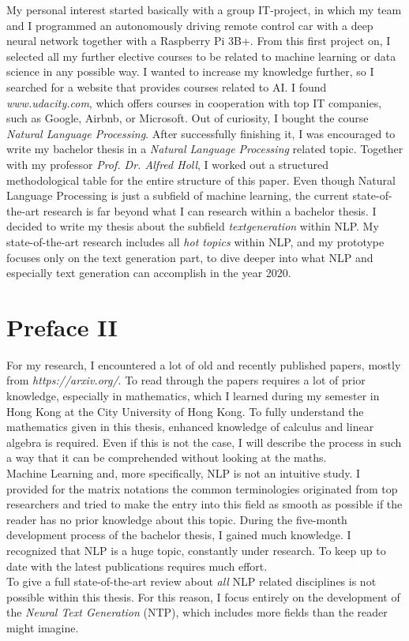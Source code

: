 My personal interest started basically with a group IT-project, in which my team and I programmed an autonomously driving remote control car with a deep neural network together with a Raspberry Pi 3B+. From this first project on, I selected all my further elective courses to be related to machine learning or data science in any possible way. I wanted to increase my knowledge further, so I searched for a website that provides courses related to AI. I found \textit{www.udacity.com}, which offers courses in cooperation with top IT companies, such as Google, Airbnb, or Microsoft. Out of curiosity, I bought the course \textit{Natural Language Processing}. After successfully finishing it, I was encouraged to write my bachelor thesis in a \textit{Natural Language Processing} related topic. 
Together with my professor \textit{Prof. Dr. Alfred Holl}, I worked out a structured methodological table for the entire structure of this paper. 
Even though Natural Language Processing is just a subfield of machine learning, the current state-of-the-art research is far beyond what I can research within a bachelor thesis. I decided to write my thesis about the subfield \textit{textgeneration} within NLP. My state-of-the-art research includes all \textit{hot topics} within NLP, and my prototype focuses only on the text generation part, to dive deeper into what NLP and especially text generation can accomplish in the year 2020.
\null\newpage

\section*{Preface II}
\label{sec:prolog_2}
For my research, I encountered a lot of old and recently published papers, mostly from \textit{https://arxiv.org/}. 
To read through the papers requires a lot of prior knowledge, especially in mathematics, which I learned during my semester in Hong Kong at the City University of Hong Kong. 
To fully understand the mathematics given in this thesis, enhanced knowledge of calculus and linear algebra is required. Even if this is not the case, I will describe the process in such a way that it can be comprehended without looking at the maths. \\
Machine Learning and, more specifically, NLP is not an intuitive study. I provided for the matrix notations the common terminologies originated from top researchers and tried to make the entry into this field as smooth as possible if the reader has no prior knowledge about this topic.
During the five-month development process of the bachelor thesis, I gained much knowledge. I recognized that NLP is a huge topic, constantly under research. To keep up to date with the latest publications requires much effort. \\
To give a full state-of-the-art review about \textit{all} NLP related disciplines is not possible within this thesis. For this reason, I focus entirely on the development of the \textit{Neural Text Generation} (NTP), which includes more fields than the reader might imagine.




